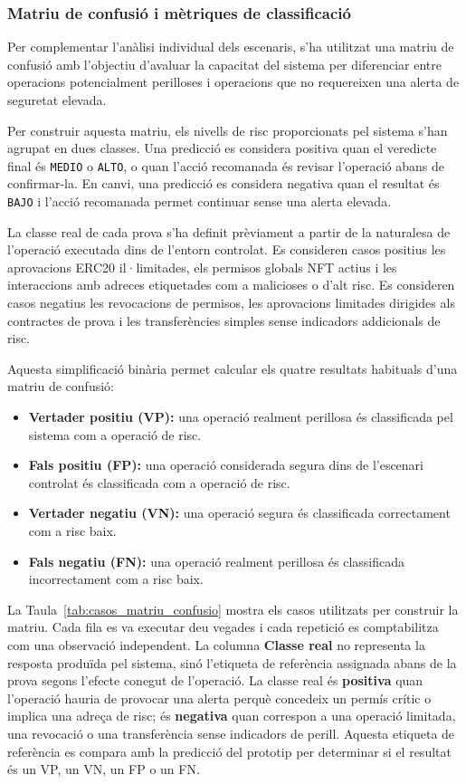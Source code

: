 \subsubsection{Matriu de confusió i mètriques de classificació}

Per complementar l’anàlisi individual dels escenaris, s’ha utilitzat una matriu de confusió amb l’objectiu d’avaluar la capacitat del sistema per diferenciar entre operacions potencialment perilloses i operacions que no requereixen una alerta de seguretat elevada.

Per construir aquesta matriu, els nivells de risc proporcionats pel sistema s’han agrupat en dues classes. Una predicció es considera positiva quan el veredicte final és \texttt{MEDIO} o \texttt{ALTO}, o quan l’acció recomanada és revisar l’operació abans de confirmar-la. En canvi, una predicció es considera negativa quan el resultat és \texttt{BAJO} i l’acció recomanada permet continuar sense una alerta elevada.

La classe real de cada prova s’ha definit prèviament a partir de la naturalesa de l’operació executada dins de l’entorn controlat. Es consideren casos positius les aprovacions ERC20 il·limitades, els permisos globals NFT actius i les interaccions amb adreces etiquetades com a malicioses o d’alt risc. Es consideren casos negatius les revocacions de permisos, les aprovacions limitades dirigides als contractes de prova i les transferències simples sense indicadors addicionals de risc.

Aquesta simplificació binària permet calcular els quatre resultats habituals d’una matriu de confusió:

\begin{itemize}
    \item \textbf{Vertader positiu (VP):} una operació realment perillosa és classificada pel sistema com a operació de risc.
    \item \textbf{Fals positiu (FP):} una operació considerada segura dins de l’escenari controlat és classificada com a operació de risc.
    \item \textbf{Vertader negatiu (VN):} una operació segura és classificada correctament com a risc baix.
    \item \textbf{Fals negatiu (FN):} una operació realment perillosa és classificada incorrectament com a risc baix.
\end{itemize}

La Taula~\ref{tab:casos_matriu_confusio} mostra els casos utilitzats per construir la matriu. Cada fila es va executar deu vegades i cada repetició es comptabilitza com una observació independent. La columna \textbf{Classe real} no representa la resposta produïda pel sistema, sinó l'etiqueta de referència assignada abans de la prova segons l'efecte conegut de l'operació. La classe real és \textbf{positiva} quan l'operació hauria de provocar una alerta perquè concedeix un permís crític o implica una adreça de risc; és \textbf{negativa} quan correspon a una operació limitada, una revocació o una transferència sense indicadors de perill. Aquesta etiqueta de referència es compara amb la predicció del prototip per determinar si el resultat és un VP, un VN, un FP o un FN.

